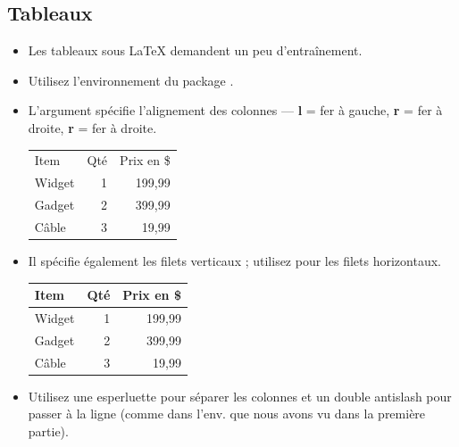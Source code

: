 \documentclass{beamer}
\begin{document}
\subsection{Tableaux}
\begin{frame}[fragile]{\insertsubsection}
\begin{itemize}
\item Les tableaux sous \LaTeX{} demandent un peu d'entraînement.
\item Utilisez l'environnement  du package .
\item L'argument spécifie l'alignement des colonnes --- \textbf{l} = fer à gauche, \textbf{r} = fer à droite, \textbf{r} = fer à droite.
\begin{exampletwouptiny}
\begin{tabular}{lrr}
Item   & Qté & Prix en \$ \\
Widget & 1   & 199,99  \\
Gadget & 2   & 399,99  \\
Câble  & 3   & 19,99   \\
\end{tabular}
\end{exampletwouptiny}
\item Il spécifie également les filets verticaux ; utilisez  pour les filets horizontaux.
\begin{exampletwouptiny}
\begin{tabular}{|l|r|r|} \hline
Item   & Qté & Prix en \$ \\\hline
Widget & 1   & 199,99  \\
Gadget & 2   & 399,99  \\
Câble  & 3   & 19,99   \\\hline
\end{tabular}
\end{exampletwouptiny}
\item Utilisez une esperluette \keystrokebftt{\&} pour séparer les colonnes et un double antislash \keystrokebftt{\bs}\keystrokebftt{\bs} pour passer à la ligne (comme dans l'env.  que nous avons vu dans la première partie).
\end{itemize}
\end{frame}

\end{document}
